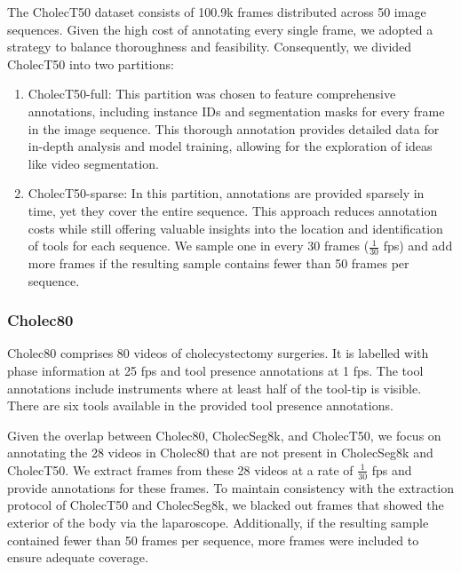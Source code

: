 The CholecT50 dataset consists of 100.9k frames distributed across 50 image sequences. Given the high cost of annotating every single frame, we adopted a strategy to balance thoroughness and feasibility. Consequently, we divided CholecT50 into two partitions:
%
\begin{enumerate}
    \item CholecT50-full: This partition was chosen to feature comprehensive annotations, including instance IDs and segmentation masks for every frame in the image sequence. This thorough annotation provides detailed data for in-depth analysis and model training, allowing for the exploration of ideas like video segmentation.
    \item CholecT50-sparse: In this partition, annotations are provided sparsely in time, yet they cover the entire sequence. This approach reduces annotation costs while still offering valuable insights into the location and identification of tools for each sequence. We sample one in every 30 frames ($\frac{1}{30}$ fps) and add more frames if the resulting sample contains fewer than 50 frames per sequence.
\end{enumerate}


\subsubsection{Cholec80}
Cholec80 comprises 80 videos of cholecystectomy surgeries. It is labelled with phase information at 25 fps and tool presence annotations at 1 fps. The tool annotations include instruments where at least half of the tool-tip is visible. There are six tools available in the provided tool presence annotations.

Given the overlap between Cholec80, CholecSeg8k, and CholecT50, we focus on annotating the 28 videos in Cholec80 that are not present in CholecSeg8k and CholecT50. We extract frames from these 28 videos at a rate of $\frac{1}{30}$ fps and provide annotations for these frames. 
To maintain consistency with the extraction protocol of CholecT50 and CholecSeg8k, we blacked out frames that showed the exterior of the body via the laparoscope. Additionally, if the resulting sample contained fewer than 50 frames per sequence, more frames were included to ensure adequate coverage.

